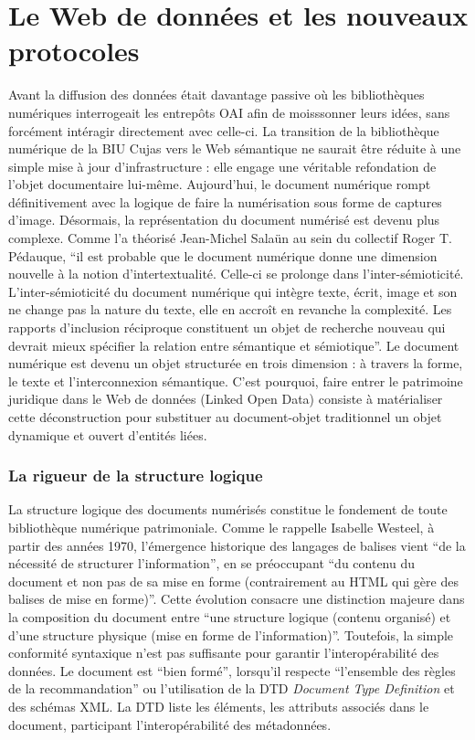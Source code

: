 \section{Le Web de données et les nouveaux protocoles}
Avant la diffusion des données était davantage passive où les bibliothèques numériques interrogeait les entrepôts OAI afin de moisssonner leurs idées, sans forcément intéragir directement avec celle-ci. La transition de la bibliothèque numérique de la BIU Cujas vers le Web sémantique ne saurait être réduite à une simple mise à jour d'infrastructure : elle engage une véritable refondation de l'objet documentaire lui-même. Aujourd'hui, le document numérique rompt définitivement avec la logique de faire la numérisation sous forme de captures d'image. Désormais, la représentation du document numérisé est devenu plus complexe. Comme l'a théorisé Jean-Michel Salaün au sein du collectif Roger T. Pédauque, \enquote{il est probable que le document numérique donne une dimension nouvelle à la notion d’intertextualité. Celle-ci se prolonge dans l’inter-sémioticité. L’inter-sémioticité du document numérique qui intègre texte, écrit, image et son ne change pas la nature du texte, elle en accroît en revanche la complexité. Les rapports d’inclusion réciproque constituent un objet de recherche nouveau qui devrait mieux spécifier la relation entre sémantique et sémiotique}. Le document numérique est devenu un objet structurée en trois dimension : à travers la forme, le texte et l'interconnexion sémantique. C'est pourquoi, faire entrer le patrimoine juridique dans le Web de données (Linked Open Data) consiste à matérialiser cette déconstruction pour substituer au document-objet traditionnel un objet dynamique et ouvert d'entités liées.

\subsubsection{La rigueur de la structure logique}
La structure logique des documents numérisés constitue le fondement de toute bibliothèque numérique patrimoniale. Comme le rappelle Isabelle Westeel, à partir des années 1970, l'émergence historique des langages de balises vient \enquote{de la nécessité de structurer l'information}, en se préoccupant \enquote{du contenu du document et non pas de sa mise en forme (contrairement au HTML qui gère des balises de mise en forme)}. Cette évolution consacre une distinction majeure dans la composition du document entre \enquote{une structure logique (contenu organisé) et d'une structure physique (mise en forme de l'information)}. Toutefois, la simple conformité syntaxique n'est pas suffisante pour garantir l'interopérabilité des données. Le document est \enquote{bien formé}, lorsqu'il respecte \enquote{l'ensemble des règles de la recommandation} ou l'utilisation de la DTD \textit{Document Type Definition} et des schémas XML. La DTD liste les éléments, les attributs associés dans le document, participant l'interopérabilité des métadonnées.

